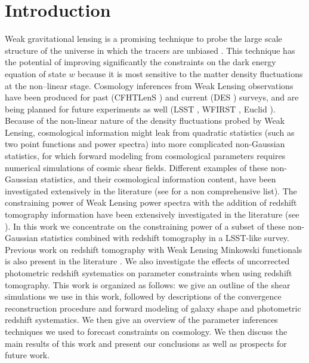 \documentclass[reprint,aps,prd,superscriptaddress,showkeys,showpacs]{revtex4-1}
\begin{document}

\section{Introduction}
%
Weak gravitational lensing is a promising technique to probe the large scale structure of the universe in which the tracers are unbiased \citep{wlreview}. This technique has the potential of improving significantly the constraints on the dark energy equation of state $w$ because it is most sensitive to the matter density fluctuations at the non--linear stage. Cosmology inferences from Weak Lensing observations have been produced for past (CFHTLenS \citep{cfht1}) and current (DES \citep{DES}) surveys, and are being planned for future experiments as well (LSST \citep{LSST}, WFIRST \citep{WFIRST}, Euclid \citep{Euclid}). Because of the non-linear nature of the density fluctuations probed by Weak Lensing, cosmological information might leak from quadratic statistics (such as two point functions and power spectra) into more complicated non-Gaussian statistics, for which forward modeling from cosmological parameters requires numerical simulations of cosmic shear fields. Different examples of these non-Gaussian statistics, and their cosmological information content, have been investigated extensively in the literature (see \citep{MinkJan,PeaksJan,NG-Marian,NG-Jain1,NG-Jain2,NG-Jain3,NG-Refregier,NG-Dietrich} for a non comprehensive list). The constraining power of Weak Lensing power spectra with the addition of redshift tomography information have been extensively investigated in the literature (see \citep{SongKnox,FangHaiman07,Huterer2006}). In this work we concentrate on the constraining power of a subset of these non-Gaussian statistics combined with redshift tomography in a LSST-like survey. Previous work on redshift tomography with Weak Lensing Minkowski functionals is also present in the literature \citep{MinkJan}. We also investigate the effects of uncorrected photometric redshift systematics on parameter constraints when using redshift tomography. This work is organized as follows: we give an outline of the shear simulations we use in this work, followed by descriptions of the convergence reconstruction procedure and forward modeling of galaxy shape and photometric redshift systematics. We then give an overview of the parameter inferences techniques we used to forecast constraints on cosmology. We then discuss the main results of this work and present our conclusions as well as prospects for future work.  
\end{document}
